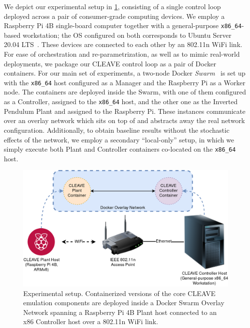 We depict our experimental setup in \cref{fig:cleave:expsetup}, consisting of a single control loop deployed across a pair of consumer-grade computing devices.
We employ a Raspberry Pi 4B single-board computer together with a general-purpose \verb|x86_64|-based workstation; the \ac{OS} configured on both corresponds to Ubuntu Server 20.04 LTS~\cite{Ubuntu}.
These devices are connected to each other by an 802.11n WiFi link.
For ease of orchestration and re-parametrization, as well as to mimic real-world deployments, we package our CLEAVE control loop as a pair of Docker~\cite{merkel2014docker} containers.
For our main set of experiments, a two-node Docker \emph{Swarm}~\cite{Swarm2021} is set up with the \verb|x86_64| host configured as a Manager and the Raspberry Pi as a Worker node.
The containers are deployed inside the Swarm, with one of them configured as a Controller, assigned to the \verb|x86_64| host, and the other one as the Inverted Pendulum Plant and assigned to the Raspberry Pi.
These instances communicate over an overlay network which sits on top of and abstracts away the real network configuration.
Additionally, to obtain baseline results without the stochastic effects of the network, we employ a secondary ``local-only'' setup, in which we simply execute both Plant and Controller containers co-located on the \verb|x86_64| host.

\begin{figure}
    \centering
    \includegraphics[width=.95\columnwidth]{images/CLEAVE_experiment_setup}
    \caption{Experimental setup. Containerized versions of the core CLEAVE emulation components are deployed inside a Docker Swarm Overlay Network spanning a Raspberry Pi 4B Plant host connected to an x86 Controller host over a 802.11n WiFi link.}\label{fig:cleave:expsetup}
\end{figure}

